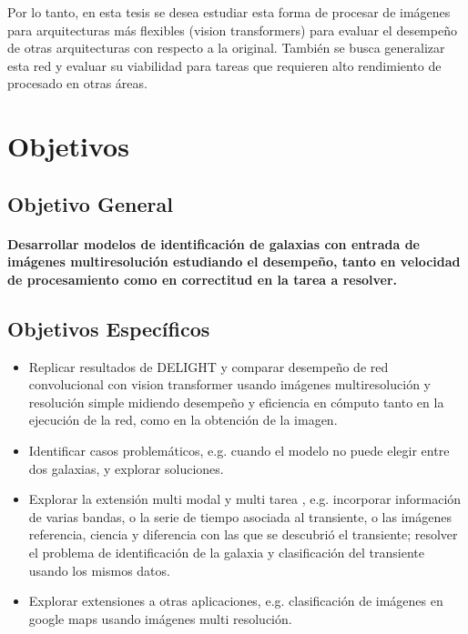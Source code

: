\documentclass[12pt,a4paper]{article}
\begin{document}
Por lo tanto, en esta tesis se desea estudiar esta forma de procesar de imágenes para arquitecturas más flexibles (vision transformers) para evaluar el desempeño de otras arquitecturas con respecto a la original. También se busca generalizar esta red y evaluar su viabilidad para tareas que requieren alto rendimiento de procesado en otras áreas. 

\section{Objetivos}
\subsection{Objetivo General}

\paragraph{Desarrollar modelos de identificación de galaxias con entrada de imágenes multiresolución estudiando el desempeño, tanto en velocidad de procesamiento como en correctitud en la tarea a resolver.}

\subsection{Objetivos Específicos}
\begin{itemize}
    \item Replicar resultados de DELIGHT \cite{delight} y comparar desempeño de red convolucional con vision transformer usando imágenes multiresolución y resolución simple midiendo desempeño y eficiencia en cómputo tanto en la ejecución de la red, como en la obtención de la imagen.
    \item Identificar casos problemáticos, e.g. cuando el modelo no puede elegir entre dos galaxias, y explorar soluciones.
    \item Explorar la extensión multi modal y multi tarea , e.g. incorporar información de varias bandas, o la serie de tiempo asociada al transiente, o las imágenes referencia, ciencia y diferencia con las que se descubrió el transiente; resolver el problema de identificación de la galaxia y clasificación del transiente usando los mismos datos.
    \item Explorar extensiones a otras aplicaciones, e.g. clasificación de imágenes en google maps usando imágenes multi resolución.
\end{itemize}
\end{document}
